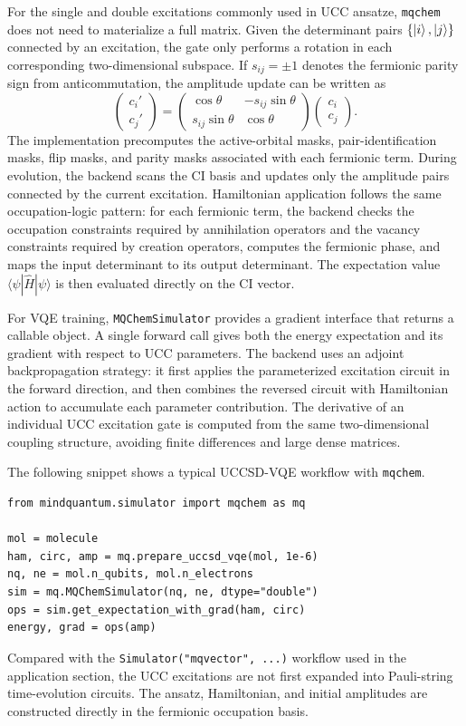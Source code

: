 For the single and double excitations commonly used in UCC ansatze, \texttt{mqchem} does not need to materialize a full matrix. Given the determinant pairs $\{\ket{i},\ket{j}\}$ connected by an excitation, the gate only performs a rotation in each corresponding two-dimensional subspace. If $s_{ij}=\pm1$ denotes the fermionic parity sign from anticommutation, the amplitude update can be written as
\begin{equation}
    \begin{pmatrix}
        c_i' \\
        c_j'
    \end{pmatrix}
    =
    \begin{pmatrix}
        \cos\theta       & -s_{ij}\sin\theta \\
        s_{ij}\sin\theta & \cos\theta
    \end{pmatrix}
    \begin{pmatrix}
        c_i \\
        c_j
    \end{pmatrix}.
\end{equation}
The implementation precomputes the active-orbital masks, pair-identification masks, flip masks, and parity masks associated with each fermionic term. During evolution, the backend scans the CI basis and updates only the amplitude pairs connected by the current excitation. Hamiltonian application follows the same occupation-logic pattern: for each fermionic term, the backend checks the occupation constraints required by annihilation operators and the vacancy constraints required by creation operators, computes the fermionic phase, and maps the input determinant to its output determinant. The expectation value $\langle\psi|\hat{H}|\psi\rangle$ is then evaluated directly on the CI vector.

For VQE training, \texttt{MQChemSimulator} provides a gradient interface that returns a callable object. A single forward call gives both the energy expectation and its gradient with respect to UCC parameters. The backend uses an adjoint backpropagation strategy: it first applies the parameterized excitation circuit in the forward direction, and then combines the reversed circuit with Hamiltonian action to accumulate each parameter contribution. The derivative of an individual UCC excitation gate is computed from the same two-dimensional coupling structure, avoiding finite differences and large dense matrices.

The following snippet shows a typical UCCSD-VQE workflow with \texttt{mqchem}.
\begin{lstlisting}
from mindquantum.simulator import mqchem as mq

mol = molecule
ham, circ, amp = mq.prepare_uccsd_vqe(mol, 1e-6)
nq, ne = mol.n_qubits, mol.n_electrons
sim = mq.MQChemSimulator(nq, ne, dtype="double")
ops = sim.get_expectation_with_grad(ham, circ)
energy, grad = ops(amp)
\end{lstlisting}
Compared with the \texttt{Simulator("mqvector", ...)} workflow used in the application section, the UCC excitations are not first expanded into Pauli-string time-evolution circuits. The ansatz, Hamiltonian, and initial amplitudes are constructed directly in the fermionic occupation basis.

